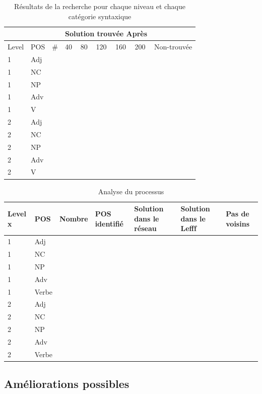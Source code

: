 \begin{table}[ht]
\centering
\begin{tabular}{|p{0.8cm} |p{0.8cm} |p{0.8cm}| p{0.8cm} |p{0.8cm}|p{0.8cm}|p{0.8cm}|p{0.8cm}|p{2.8cm}|}
\hline
 &  &  & \multicolumn{5}{c}{Solution trouvée Après} & \\[0.5ex]
\hline
Level & POS & \# & 40 & 80 & 120 & 160 & 200 & Non-trouvée\\[0.5ex]
\hline
\hline
1 & Adj & & & & & & &\\[0.5ex]
\hline
1 & NC & & & & & & &\\[0.5ex]
\hline
1 & NP & & & & & & &\\[0.5ex]
\hline
1 & Adv & & & & & & &\\[0.5ex]
\hline
1 & V & & & & & & &\\[0.5ex]
\hline
2 & Adj & & & & & & &\\[0.5ex]
\hline
2 & NC & & & & & & &\\[0.5ex]
\hline
2 & NP & & & & & & &\\[0.5ex]
\hline
2 & Adv & & & & & & &\\[0.5ex]
\hline
2 & V & & & & & & &\\[0.5ex]
\hline
\end{tabular}
\caption{Résultats de la recherche pour chaque niveau et chaque catégorie syntaxique}
\label{table:nonlin}
\end{table}

\begin{table}[ht]
\centering
\begin{tabular}{|p{1.8cm}|p{1.8cm}|p{1.8cm}|p{1.8cm}|p{1.8cm}|p{1.8cm}|p{1.8cm}|}
\hline
Level x & POS & Nombre & POS identifié & Solution dans le réseau & Solution dans le Lefff & Pas de voisins\\[0.5ex]
\hline\hline
1 & Adj & & & & & \\[0.5ex]
\hline
1 & NC & & & & &\\[0.5ex] 
\hline
1 & NP & & & & & \\[0.5ex]
\hline
1 & Adv & & & & & \\[0.5ex]
\hline
1 & Verbe & & & & & \\[0.5ex]
\hline
2 & Adj & & & & & \\[0.5ex]
\hline
2 & NC & & & & &\\[0.5ex] 
\hline
2 & NP & & & & & \\[0.5ex]
\hline
2 & Adv & & & & & \\[0.5ex]
\hline
2 & Verbe & & & & & \\[0.5ex]
\hline
\end{tabular}
\caption{Analyse du processus}
\label{table:nonlin}
\end{table}





\subsection{Améliorations possibles}
